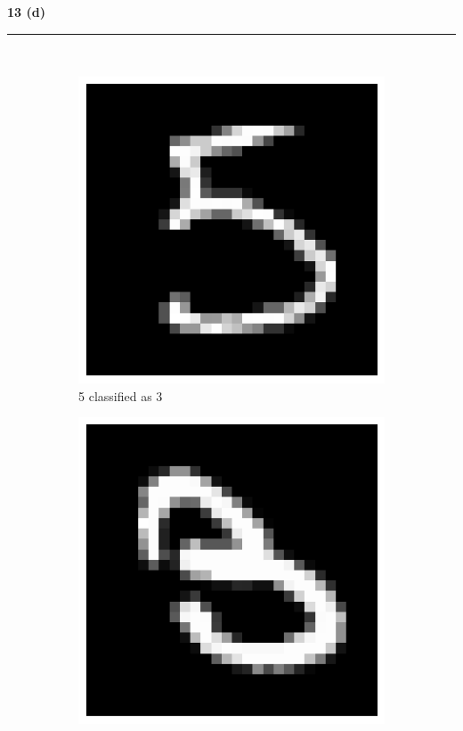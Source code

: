 \documentclass{article}
\begin{document}
\newpage
\parbox{\textwidth}{\textbf{13 (d)}}

\noindent\rule{\textwidth}{0.4pt}\\
\begin{figure}[H]
    \centering
    \begin{subfigure}[b]{0.3\textwidth}
        \centering
        \includegraphics[width=\textwidth]{digit1.png}
        \caption{5 classified as 3}
        \label{fig:digit1}
    \end{subfigure}
    \hfill
    \begin{subfigure}[b]{0.3\textwidth}
        \centering
        \includegraphics[width=\textwidth]{digit2.png}

\end{subfigure}
\end{figure}
\end{document}
